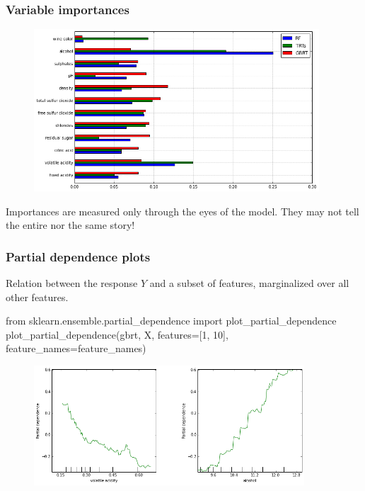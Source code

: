 \documentclass{beamer}
\begin{document}
\begin{frame}[fragile]
  \frametitle{Variable importances}

\begin{figure}
\includegraphics[width=0.95\textwidth]{./figures/importances.png}
\end{figure}

\begin{center}
Importances are measured only through the eyes of the model.
{\color{red}They may not tell the entire nor the same story!} \citep{louppe:2013}
\end{center}

\end{frame}

\begin{frame}[fragile]
  \frametitle{Partial dependence plots}

Relation between the response $Y$ and a subset of features, marginalized over all other features.

\vspace{0.25cm}

{\scriptsize
\begin{pythoncode}
from sklearn.ensemble.partial_dependence import plot_partial_dependence
plot_partial_dependence(gbrt, X,
                        features=[1, 10], feature_names=feature_names)
\end{pythoncode}
}

    \begin{figure}
       \centering
       \includegraphics[width=0.9\textwidth]{./figures/dependence.png}
    \end{figure}
\end{frame}
\end{document}

